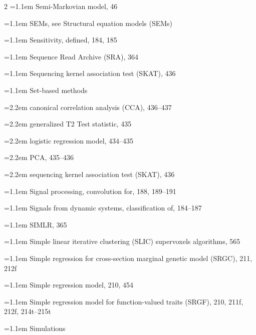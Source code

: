 \begin{multicols}{2}
\noindent\hangindent=1.1em Semi-Markovian model, 46\par
\noindent\hangindent=1.1em SEMs, see Structural equation models (SEMs)\par
\noindent\hangindent=1.1em Sensitivity, defined, 184, 185\par
\noindent\hangindent=1.1em Sequence Read Archive (SRA), 364\par
\noindent\hangindent=1.1em Sequencing kernel association test (SKAT), 436\par
\noindent\hangindent=1.1em Set-based methods\par
\noindent\hangindent=2.2em \hspace*{1.1em}canonical correlation analysis (CCA), 436--437\par
\noindent\hangindent=2.2em \hspace*{1.1em}generalized T2 Test statistic, 435\par
\noindent\hangindent=2.2em \hspace*{1.1em}logistic regression model, 434--435\par
\noindent\hangindent=2.2em \hspace*{1.1em}PCA, 435--436\par
\noindent\hangindent=2.2em \hspace*{1.1em}sequencing kernel association test (SKAT), 436\par
\noindent\hangindent=1.1em Signal processing, convolution for, 188, 189--191\par
\noindent\hangindent=1.1em Signals from dynamic systems, classification of, 184--187\par
\noindent\hangindent=1.1em SIMLR, 365\par
\noindent\hangindent=1.1em Simple linear iterative clustering (SLIC) supervoxels algorithms, 565\par
\noindent\hangindent=1.1em Simple regression for cross-section marginal genetic model (SRGC), 211, 212f\par
\noindent\hangindent=1.1em Simple regression model, 210, 454\par
\noindent\hangindent=1.1em Simple regression model for function-valued traits (SRGF), 210, 211f, 212f, 214t--215t\par
\noindent\hangindent=1.1em Simulations\par

\end{multicols}
